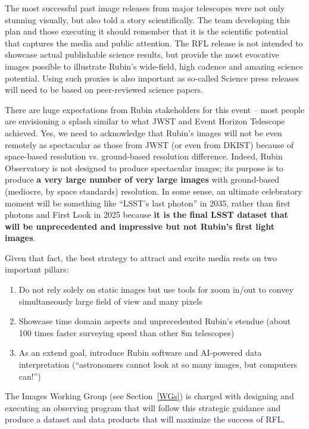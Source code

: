 The most successful past image releases from major telescopes were not only stunning visually, but also told a story scientifically. The team developing this plan and those executing it should remember that it is the scientific potential that captures the media and public attention. The RFL release is not intended to showcase actual publishable science results, but provide the most evocative images possible to illustrate Rubin’s wide-field, high cadence and amazing science potential. Using such proxies is also important as so-called Science press releases will need to be based on peer-reviewed science papers.


There are huge expectations from Rubin stakeholders for this event -- most people are envisioning a splash similar to what JWST and Event Horizon Telescope achieved. Yes, we need to acknowledge that Rubin’s images will not be even remotely as spectacular as those from
JWST (or even from DKIST) because of space-based resolution vs. ground-based resolution difference. Indeed, Rubin Observatory is not designed to produce spectacular images; its purpose is to produce {\bf a very large number of very large 
images} with ground-based (mediocre, by space standards) resolution. In some sense, an ultimate celebratory moment 
will be something like ``LSST’s last photon'' in 2035, rather than first photons and First Look in 2025 because
{\bf it is the final LSST dataset that will be unprecedented and impressive but not Rubin's first light images}. 

Given that fact, the best strategy to attract and excite media rests on two important pillars:
\begin{enumerate} 
\item Do not rely solely on static images but use tools for zoom in/out to convey simultaneously large field of view and many pixels 
\item Showcase time domain aspects and unprecedented Rubin's etendue (about 100 times faster surveying speed than other 8m telescopes) 
\item As an extend goal, introduce Rubin software and AI-powered data interpretation (``astronomers cannot look at so many images, but computers can!'')
\end{enumerate}

The Images Working Group (see Section~\ref{WGs}) is charged with designing and executing an observing
program that will follow this strategic guidance and produce a dataset and data products that will
maximize the success of RFL. 

